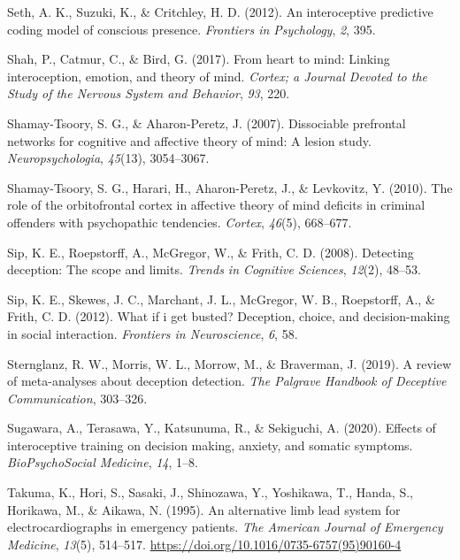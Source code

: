 \documentclass[
  man,mask,floatsintext]{apa6}
\newlength{\cslhangindent}
\newlength{\cslentryspacingunit} %
\newenvironment{CSLReferences}[2] %
 {%
  \setlength{\parindent}{0pt}
  \ifodd #1
  \let\oldpar\par
  \def\par{\hangindent=\cslhangindent\oldpar}
  \fi
  \setlength{\parskip}{#2\cslentryspacingunit}
 }%
 {}
\begin{document}
\begin{CSLReferences}{1}{0}
\leavevmode{}%
Seth, A. K., Suzuki, K., \& Critchley, H. D. (2012). An interoceptive predictive coding model of conscious presence. \emph{Frontiers in Psychology}, \emph{2}, 395.

\leavevmode{}%
Shah, P., Catmur, C., \& Bird, G. (2017). From heart to mind: Linking interoception, emotion, and theory of mind. \emph{Cortex; a Journal Devoted to the Study of the Nervous System and Behavior}, \emph{93}, 220.

\leavevmode{}%
Shamay-Tsoory, S. G., \& Aharon-Peretz, J. (2007). Dissociable prefrontal networks for cognitive and affective theory of mind: A lesion study. \emph{Neuropsychologia}, \emph{45}(13), 3054--3067.

\leavevmode{}%
Shamay-Tsoory, S. G., Harari, H., Aharon-Peretz, J., \& Levkovitz, Y. (2010). The role of the orbitofrontal cortex in affective theory of mind deficits in criminal offenders with psychopathic tendencies. \emph{Cortex}, \emph{46}(5), 668--677.

\leavevmode{}%
Sip, K. E., Roepstorff, A., McGregor, W., \& Frith, C. D. (2008). Detecting deception: The scope and limits. \emph{Trends in Cognitive Sciences}, \emph{12}(2), 48--53.

\leavevmode{}%
Sip, K. E., Skewes, J. C., Marchant, J. L., McGregor, W. B., Roepstorff, A., \& Frith, C. D. (2012). What if i get busted? Deception, choice, and decision-making in social interaction. \emph{Frontiers in Neuroscience}, \emph{6}, 58.

\leavevmode{}%
Sternglanz, R. W., Morris, W. L., Morrow, M., \& Braverman, J. (2019). A review of meta-analyses about deception detection. \emph{The Palgrave Handbook of Deceptive Communication}, 303--326.

\leavevmode{}%
Sugawara, A., Terasawa, Y., Katsunuma, R., \& Sekiguchi, A. (2020). Effects of interoceptive training on decision making, anxiety, and somatic symptoms. \emph{BioPsychoSocial Medicine}, \emph{14}, 1--8.

\leavevmode{}%
Takuma, K., Hori, S., Sasaki, J., Shinozawa, Y., Yoshikawa, T., Handa, S., Horikawa, M., \& Aikawa, N. (1995). An alternative limb lead system for electrocardiographs in emergency patients. \emph{The American Journal of Emergency Medicine}, \emph{13}(5), 514--517. \url{https://doi.org/10.1016/0735-6757(95)90160-4}


\end{CSLReferences}
\end{document}
